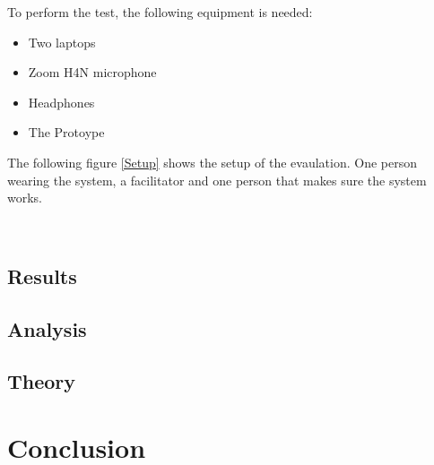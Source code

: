 To perform the test, the following equipment is needed:
\begin{itemize}
 \item Two laptops
 \item Zoom H4N microphone 
 \item Headphones
 \item The Protoype
\end{itemize}

The following figure \ref{Setup} shows the setup of the evaulation. One person wearing the system, a facilitator and one person that makes sure the system works. 

\begin{minipage}{\linewidth}%
\label{Setup}
\end{minipage}\\

\subsection{Results}


\subsection{Analysis}

\subsection{Theory}


\section{Conclusion}